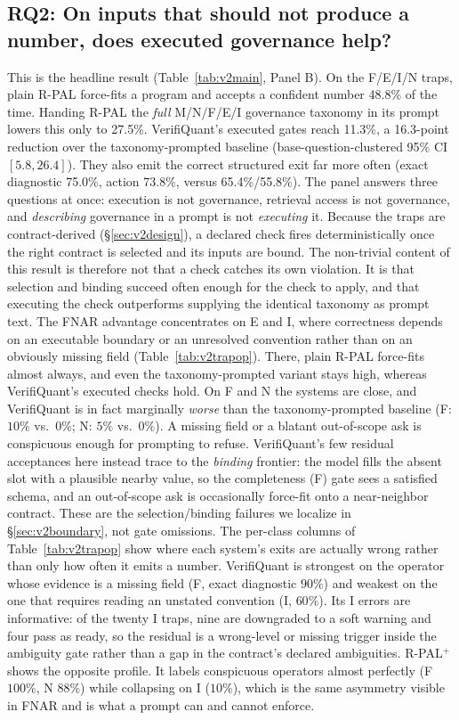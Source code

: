 \documentclass[sigconf,anonymous]{acmart}
\newcommand{\govVQfnar}{11.3\%}           %
\newcommand{\govPromptFnar}{27.5\%}       %
\newcommand{\govPlainFnar}{48.8\%}        %
\newcommand{\govGap}{16.3}                %
\newcommand{\govCIlo}{5.8}                %
\newcommand{\govCIhi}{26.4}               %
\newcommand{\govVQdiag}{75.0\%}
\newcommand{\govVQaction}{73.8\%}
\newcommand{\govPromptDiag}{65.4\%}
\newcommand{\govPromptAction}{55.8\%}
\begin{document}
\subsection{RQ2: On inputs that should not produce a number, does executed governance help?}
This is the headline result (Table~\ref{tab:v2main}, Panel B).
On the F/E/I/N traps, plain R-PAL force-fits a program and accepts a confident number \govPlainFnar{} of the time.
Handing R-PAL the \emph{full} M/N/F/E/I governance taxonomy in its prompt lowers this only to \govPromptFnar{}.
VerifiQuant's executed gates reach \govVQfnar{}, a \govGap{}-point reduction over the taxonomy-prompted baseline (base-question-clustered 95\% CI $[\govCIlo{},\govCIhi{}]$). They also emit the correct structured exit far more often (exact diagnostic \govVQdiag{}, action \govVQaction{}, versus \govPromptDiag{}/\govPromptAction{}).
The panel answers three questions at once: execution is not governance, retrieval access is not governance, and \emph{describing} governance in a prompt is not \emph{executing} it.
Because the traps are contract-derived (\S\ref{sec:v2design}), a declared check fires deterministically once the right contract is selected and its inputs are bound. The non-trivial content of this result is therefore not that a check catches its own violation. It is that selection and binding succeed often enough for the check to apply, and that executing the check outperforms supplying the identical taxonomy as prompt text.
The FNAR advantage concentrates on E and I, where correctness depends on an executable boundary or an unresolved convention rather than on an obviously missing field (Table~\ref{tab:v2trapop}). There, plain R-PAL force-fits almost always, and even the taxonomy-prompted variant stays high, whereas VerifiQuant's executed checks hold.
On F and N the systems are close, and VerifiQuant is in fact marginally \emph{worse} than the taxonomy-prompted baseline (F: $10\%$ vs.\ $0\%$; N: $5\%$ vs.\ $0\%$). A missing field or a blatant out-of-scope ask is conspicuous enough for prompting to refuse. VerifiQuant's few residual acceptances here instead trace to the \emph{binding} frontier: the model fills the absent slot with a plausible nearby value, so the completeness (F) gate sees a satisfied schema, and an out-of-scope ask is occasionally force-fit onto a near-neighbor contract.
These are the selection/binding failures we localize in \S\ref{sec:v2boundary}, not gate omissions.
The per-class columns of Table~\ref{tab:v2trapop} show where each system's exits are actually wrong rather than only how often it emits a number. VerifiQuant is strongest on the operator whose evidence is a missing field (F, exact diagnostic $90\%$) and weakest on the one that requires reading an unstated convention (I, $60\%$). Its I errors are informative: of the twenty I traps, nine are downgraded to a soft warning and four pass as ready, so the residual is a wrong-level or missing trigger inside the ambiguity gate rather than a gap in the contract's declared ambiguities. R-PAL$^{+}$ shows the opposite profile. It labels conspicuous operators almost perfectly (F $100\%$, N $88\%$) while collapsing on I ($10\%$), which is the same asymmetry visible in FNAR and is what a prompt can and cannot enforce.
\end{document}
